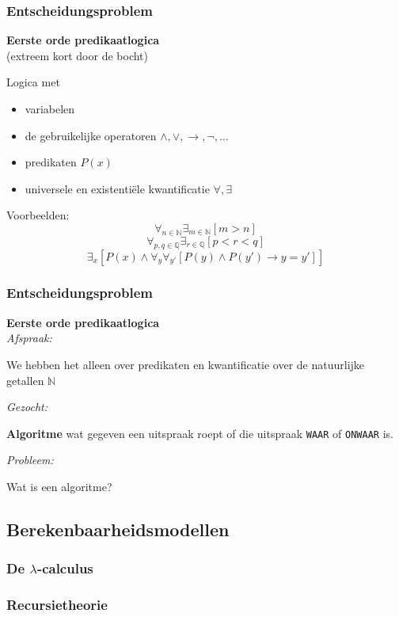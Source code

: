 \documentclass{beamer}
\begin{document}
\begin{frame}
    \frametitle{Entscheidungsproblem}
    \textbf{Eerste orde predikaatlogica} \\
    (extreem kort door de bocht) 
    \bigskip
    
    Logica met
    \begin{itemize}
        \item variabelen
        \item de gebruikelijke operatoren $\wedge, \vee, \rightarrow, \neg, \ldots$
        \item predikaten $P(x)$
        \item universele en existentiële kwantificatie $\forall, \exists$
    \end{itemize}

    Voorbeelden:
    $$\forall_{n \in \mathbb{N}}\exists_{m \in \mathbb{N}} [m>n]$$
    $$\forall_{p, q \in \mathbb{Q}} \exists_{r \in \mathbb{Q}}  [ p < r < q]$$
    $$\exists_x [P(x)\wedge \forall_y \forall_{y'}[P(y) \wedge P(y') \rightarrow y = y']]$$
\end{frame}

\begin{frame}
    \frametitle{Entscheidungsproblem}
    \textbf{Eerste orde predikaatlogica} \\

    \emph{Afspraak:}

    We hebben het alleen over predikaten en kwantificatie over de natuurlijke getallen $\mathbb{N}$

    \vspace{1cm}

    \emph{Gezocht: }
    
    \textbf{Algoritme} wat gegeven een uitspraak roept of die uitspraak \texttt{WAAR} of \texttt{ONWAAR} is.

    \vspace{1cm}
    \emph{Probleem: }
    
    Wat is een algoritme?
\end{frame}

\subsection{Berekenbaarheidsmodellen}
\begin{frame}
    \frametitle{De $\lambda$-calculus}
\end{frame}

\begin{frame}
    \frametitle{Recursietheorie}

\end{frame}
\end{document}
